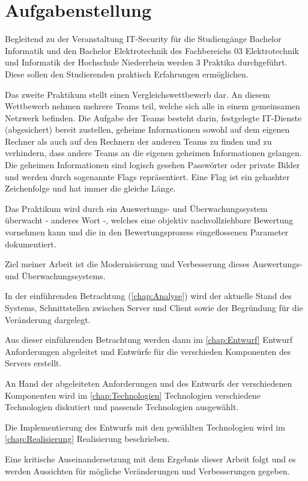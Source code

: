 \section{Aufgabenstellung}
\label{sec:Aufgabenstellung}
Begleitend zu der Veranstaltung IT-Security für die Studiengänge Bachelor Informatik und den Bachelor Elektrotechnik des Fachbereichs 03 Elektrotechnik und Informatik der Hochschule Niederrhein werden 3 Praktika durchgeführt. Diese sollen den Studierenden praktisch Erfahrungen ermöglichen.

Das zweite Praktikum  stellt einen Vergleichswettbewerb dar. An diesem Wettbewerb nehmen mehrere Teams teil, welche sich alle in einem gemeinsamen Netzwerk befinden. Die Aufgabe der Teams besteht darin, festgelegte IT-Dienste (abgesichert) bereit zustellen, geheime Informationen sowohl auf dem eigenen Rechner als auch auf den Rechnern der anderen Teams zu finden und zu verhindern, dass andere Teams an die eigenen geheimen Informationen gelangen.\cite[S. 2]{sosnaKonzeptionUndRealisierung2010} Die geheimen Informationen sind logisch gesehen Passwörter oder private Bilder und werden durch sogenannte Flags repräsentiert. Eine Flag ist ein gehashter Zeichenfolge und hat immer die gleiche Länge.

Das Praktikum wird durch ein Auswertungs- und Überwachungssystem überwacht - anderes Wort -, welches eine objektiv nachvollziehbare Bewertung vornehmen kann und die in den Bewertungsprozess eingeflossenen Parameter dokumentiert.\cite[S. 2]{sosnaKonzeptionUndRealisierung2010}

Ziel meiner Arbeit ist die Modernisierung und Verbesserung dieses Auswertungs- und Überwachungssystems.

In der einführenden Betrachtung (\autoref{chap:Analyse}) wird der aktuelle Stand des Systems, Schnittstellen zwischen Server und Client sowie der Begründung für die Veränderung dargelegt. 

Aus dieser einführenden Betrachtung werden dann im \autoref{chap:Entwurf} Entwurf Anforderungen abgeleitet und Entwürfe für die verschieden Komponenten des Servers erstellt. 

An Hand der abgeleiteten Anforderungen und des Entwurfs der verschiedenen Komponenten wird im \autoref{chap:Technologien} Technologien verschiedene Technologien diskutiert und passende Technologien ausgewählt.

Die Implementierung des Entwurfs mit den gewählten Technologien wird im \autoref{chap:Realisierung} Realisierung beschrieben.

Eine kritische Auseinandersetzung mit dem Ergebnis dieser Arbeit folgt und es werden Aussichten für mögliche Veränderungen und Verbesserungen gegeben.